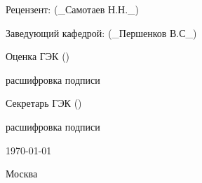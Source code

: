 \begin{titlepage}
\begin{center}
Рецензент:\hspace{3.05cm} \underline{\hspace{6cm}} \hspace{\fill}(\_Самотаев Н.Н.\_)\\ 
\vspace{1em}
 
Заведующий кафедрой:\hspace{0.2cm} \underline{\hspace{6cm}} \hspace{\fill}(\_Першенков В.С\_)\\ 
\vspace{1em}
 
Оценка ГЭК\hspace{2.65cm} \underline{\hspace{6cm}} \hspace{\fill}(\underline{\hspace{4cm}})\\
\begin{footnotesize}
\hspace{\fill}\underline{\hspace{0.3cm}}расшифровка подписи\underline{\hspace{0.3cm}}\\
\end{footnotesize}
Секретарь ГЭК\hspace{2.05cm} \underline{\hspace{6cm}} \hspace{\fill}(\underline{\hspace{4cm}})\\ 

\begin{footnotesize}
\hspace{\fill}\underline{\hspace{0.3cm}}расшифровка подписи\underline{\hspace{0.3cm}}\\
\end{footnotesize}

\end{center}
 
\vspace{\fill}

\begin{center}
\today
\end{center}


\begin{center}
Москва
\end{center}

\end{titlepage}
